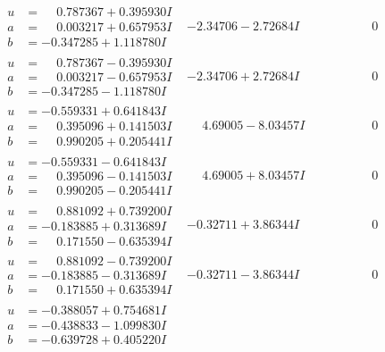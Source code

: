 \documentclass[1p]{elsarticle_modified}
\theoremstyle{definition}
\begin{document}
$$\begin{array}{c|c|c}
\begin{aligned}
u &= \phantom{-}0.787367 + 0.395930 I \\
a &= \phantom{-}0.003217 + 0.657953 I \\
b &= -0.347285 + 1.118780 I\end{aligned}
 & -2.34706 - 2.72684 I & \phantom{-0.000000 } 0 \\ \hline\begin{aligned}
u &= \phantom{-}0.787367 - 0.395930 I \\
a &= \phantom{-}0.003217 - 0.657953 I \\
b &= -0.347285 - 1.118780 I\end{aligned}
 & -2.34706 + 2.72684 I & \phantom{-0.000000 } 0 \\ \hline\begin{aligned}
u &= -0.559331 + 0.641843 I \\
a &= \phantom{-}0.395096 + 0.141503 I \\
b &= \phantom{-}0.990205 + 0.205441 I\end{aligned}
 & \phantom{-}4.69005 - 8.03457 I & \phantom{-0.000000 } 0 \\ \hline\begin{aligned}
u &= -0.559331 - 0.641843 I \\
a &= \phantom{-}0.395096 - 0.141503 I \\
b &= \phantom{-}0.990205 - 0.205441 I\end{aligned}
 & \phantom{-}4.69005 + 8.03457 I & \phantom{-0.000000 } 0 \\ \hline\begin{aligned}
u &= \phantom{-}0.881092 + 0.739200 I \\
a &= -0.183885 + 0.313689 I \\
b &= \phantom{-}0.171550 - 0.635394 I\end{aligned}
 & -0.32711 + 3.86344 I & \phantom{-0.000000 } 0 \\ \hline\begin{aligned}
u &= \phantom{-}0.881092 - 0.739200 I \\
a &= -0.183885 - 0.313689 I \\
b &= \phantom{-}0.171550 + 0.635394 I\end{aligned}
 & -0.32711 - 3.86344 I & \phantom{-0.000000 } 0 \\ \hline\begin{aligned}
u &= -0.388057 + 0.754681 I \\
a &= -0.438833 - 1.099830 I \\
b &= -0.639728 + 0.405220 I\end{aligned}

\end{array}$$
\end{document}
